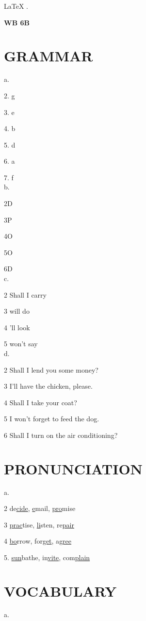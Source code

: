 \documentclass{article}
\begin{document}
\begin{center}
    \color{pink}
    \LARGE
    \LaTeX
    \color{lime}
    .
\end{center}

\textbf{WB 6B}

\section*{GRAMMAR}
a.

    2. g

    3. e

    4. b
    
    5. d

    6. a
    
    7. f
\\
b. 

    2D

    3P

    4O
    
    5O
    
    6D
\\
c.

2 Shall I carry

3 will do

4 'll look

5 won't say
\\
d.

2 Shall I lend you some money?

3 I'll have the chicken, please.

4 Shall I take your coat?

5 I won't forget to feed the dog.

6 Shall I turn on the air conditioning?
\section*{PRONUNCIATION}
a.

2 de\underline{cide}, \underline{e}mail, \underline{pro}mise 

3 \underline{prac}tise, \underline{li}sten, re\underline{pair}

4 \underline{bo}rrow, for\underline{get}, a\underline{gree}

5. \underline{sun}bathe, in\underline{vite}, com\underline{plain}

\section*{VOCABULARY}

a.
\end{document}
